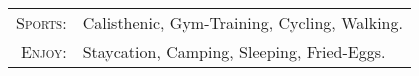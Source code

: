 %
%



\begin{tabular}{rl}
    \textsc{Sports:} & Calisthenic, Gym-Training, Cycling, Walking.\\
    \textsc{Enjoy:} & Staycation, Camping, Sleeping, Fried-Eggs.\\
\end{tabular}